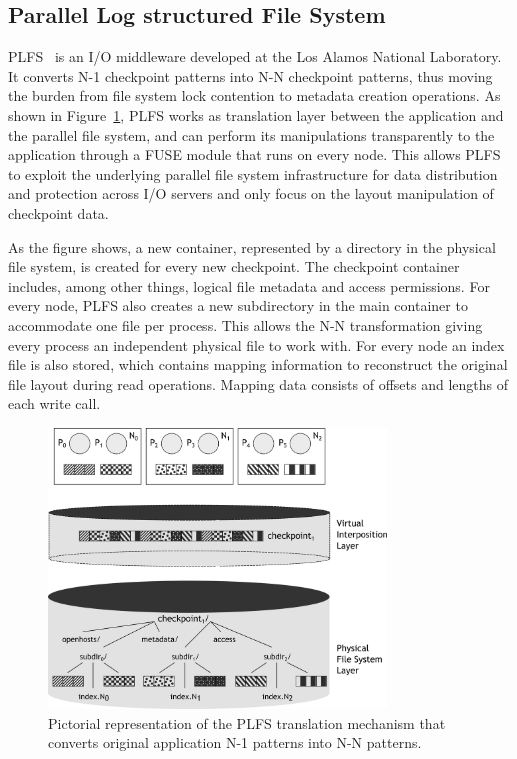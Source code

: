 \subsection{Parallel Log structured File System}
PLFS~\cite{Bent2009} is an I/O middleware developed at the Los Alamos National Laboratory. It converts N-1 checkpoint patterns into N-N checkpoint patterns, thus moving the burden from file system lock 
contention to metadata creation operations. As shown in Figure~\ref{figure: plfs}, PLFS works as translation layer between the application and the parallel file system, and can perform its manipulations
transparently to the application through a FUSE module that runs on every node. This allows PLFS to exploit the underlying parallel file system infrastructure for data distribution and protection 
across I/O servers and only focus on the layout manipulation of checkpoint data.

As the figure shows, a new container, represented by a directory in the physical file system, is created for every new checkpoint. The checkpoint container includes, among other things, logical
file metadata and access permissions. For every node, PLFS also creates a new subdirectory in the main container to accommodate one file per process. This allows the N-N transformation giving every
process an independent physical file to work with. For every node an index file is also stored, which contains mapping information to reconstruct the original file layout during read operations. 
Mapping data consists of offsets and lengths of each write call.

\begin{figure}
\centering
\includegraphics[width=0.8\textwidth]{figures/plfs}
\caption{Pictorial representation of the PLFS translation mechanism that converts original application N-1 patterns into N-N patterns.}
\label{figure: plfs}
\end{figure}

